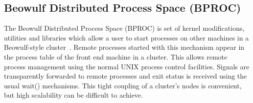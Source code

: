 %
%
%

\subsection*{Beowulf Distributed Process Space (BPROC)}

The Beowulf Distributed Process Space 
(BPROC)
is set of kernel
modifications, utilities and libraries which allow a user to start
processes on other machines in a Beowulf-style cluster~\cite{BProc}.  Remote
processes started with this mechanism appear in the process table
of the front end machine in a cluster. This allows remote process
management using the normal UNIX process control facilities. Signals
are transparently forwarded to remote processes and exit status is
received using the usual wait() mechanisms. This tight coupling of 
a cluster's nodes is convenient, but high scalability can be difficult 
to achieve.

